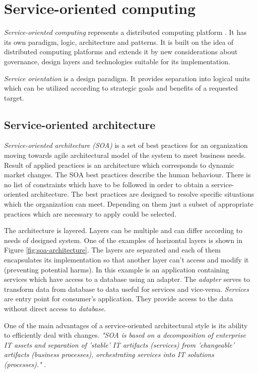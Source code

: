 \chapter{Service-oriented computing}
\label{chap:service-oriented computing}
\emph{Service-oriented computing} represents a distributed computing platform \cite{soa-contract}. It has its own paradigm, logic, architecture and patterns. It is built on the idea of distributed computing platforms and extends it by new considerations about governance, design layers and technologies suitable for its implementation.


\emph{Service orientation} is a design paradigm. It provides separation into logical units which can be utilized according to strategic goals and benefits of a requested target.

\section{Service-oriented architecture}
\emph{Service-oriented architecture (SOA)} is a set of best practices for an organization moving towards \gls{agile} architectural model of the system to meet business needs. Result of applied practices is an architecture which corresponds to dynamic market changes. The SOA best practices describe the human behaviour. There is no list of constraints which have to be followed in order to obtain a service-oriented architecture. The best practices are designed to resolve specific situations which the organization can meet. Depending on them just a subset of appropriate practices which are necessary to apply could be selected.\par

The architecture is layered. Layers can be multiple and can differ according to needs of designed system. One of the examples of horizontal layers is shown in Figure \ref{fig:soa-architecture}. The layers are separated and each of them encapsulates its implementation so that another layer can't access and modify it (preventing potential harms). In this example is an application containing services which have access to a database using an adapter. The \textit{\gls{adapter}} serves to transform data from database to data useful for services and vice-versa. \textit{Services} are entry point for consumer's application. They provide access to the data without direct access to \textit{database}.

One of the main advantages of a service-oriented architectural style is its ability to efficiently deal with changes. \textit{"SOA is based on a decomposition of enterprise IT assets and separation of 'stable' IT artifacts (services) from 'changeable' artifacts (business processes), orchestrating services into IT solutions (processes)."} \cite{website:versioning-in-soa}. %

